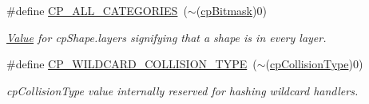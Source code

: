 \begin{DoxyCompactItemize}
\mbox{\label{group__basicTypes_ga591693fbd3ed24f3365ef7accf349d4f}} 
\#define \hyperlink{group__basicTypes_ga591693fbd3ed24f3365ef7accf349d4f}{C\+P\+\_\+\+A\+L\+L\+\_\+\+C\+A\+T\+E\+G\+O\+R\+I\+ES}~($\sim$(\hyperlink{group__basicTypes_gae7ff94f62e00cae288c1991958822743}{cp\+Bitmask})0)
\begin{DoxyCompactList}\small\item\em \hyperlink{classValue}{Value} for cp\+Shape.\+layers signifying that a shape is in every layer. \end{DoxyCompactList}\item 
\mbox{\label{group__basicTypes_ga3c81e881eb469ffacbe318a5a991c5bc}} 
\#define \hyperlink{group__basicTypes_ga3c81e881eb469ffacbe318a5a991c5bc}{C\+P\+\_\+\+W\+I\+L\+D\+C\+A\+R\+D\+\_\+\+C\+O\+L\+L\+I\+S\+I\+O\+N\+\_\+\+T\+Y\+PE}~($\sim$(\hyperlink{group__basicTypes_gae83e2f50965eb441e36ffff1e32e6d02}{cp\+Collision\+Type})0)
\begin{DoxyCompactList}\small\item\em cp\+Collision\+Type value internally reserved for hashing wildcard handlers. \end{DoxyCompactList}\end{DoxyCompactItemize}
